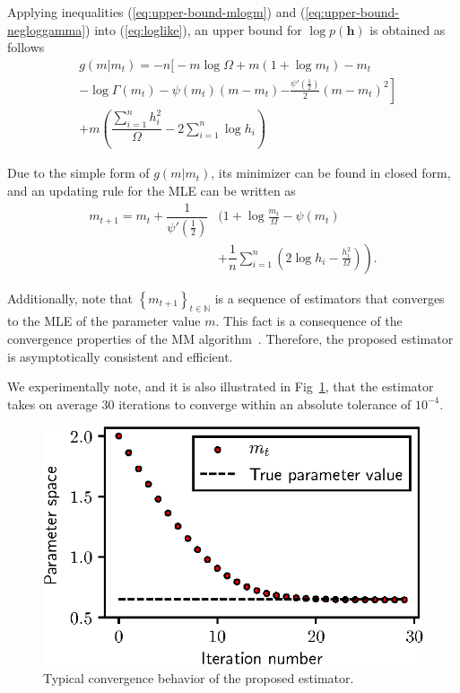 \documentclass[conference, 10pt]{IEEEtran}
\begin{document}
Applying inequalities (\ref{eq:upper-bound-mlogm}) and (\ref{eq:upper-bound-negloggamma}) into
(\ref{eq:loglike}), an upper bound for $\log p(\bm{h})$ is obtained as follows
\begin{align}
    &g(m | m_t) = - n\left.\Bigg[-m\log\Omega  + m(1 + \log m_t) - m_t\right.\nonumber\\
    & -\log \Gamma(m_t) - \psi(m_t) (m - m_t) \left. - \frac{\psi'\left(\frac{1}{2}\right)}{2}(m - m_t)^2\right]\nonumber\\
    & +m\left(\dfrac{\sum_{i=1}^{n}h_i^2}{\Omega} - 2\sum_{i=1}^{n}\log h_i\right)
    \label{eq:surrogate}
\end{align}

Due to the simple form of $g(m | m_t)$, its minimizer can be found in closed form, and
an updating rule for the MLE can be written as
\begin{align}
    m_{t+1} = m_t + \dfrac{1}{\psi'(\frac{1}{2})}&\left.\Bigg(1 + \log \frac{m_t}{\Omega} - \psi(m_t) \right.\nonumber\\
    &\left.+ \dfrac{1}{n} \sum_{i=1}^{n}\left(2\log h_i - \frac{h_i^2}{\Omega}\right)\right).
\end{align}

Additionally,
note that $\left\{m_{t+1}\right\}_{t \in \mathbb{N}}$ is a sequence of
estimators that converges to the MLE of the parameter value $m$. This
fact is a consequence of the convergence properties of the MM algorithm~\cite{sun2016}.
Therefore, the proposed estimator is asymptotically consistent and efficient.

We experimentally note, and it is also illustrated in Fig~\ref{fig:mm-example}, that the
estimator takes on average 30 iterations to converge within an absolute tolerance of $10^{-4}$.
\begin{figure}[!htb]
    \centering
    \includegraphics{figures/mm.eps}
    \caption{Typical convergence behavior of the proposed estimator.}
    \label{fig:mm-example}
\end{figure}
\end{document}
